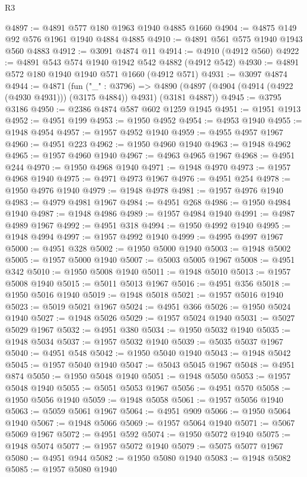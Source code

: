 \begin{lexlean}{R3}
\begin{coremodule}
@4897 := @4891 @577 @180 @1963 @1940 @4885 @1660
@4904 := @4875 @149 @92 @576 @1961 @1940 @4884 @4885
@4910 := @4891 @561 @575 @1940 @1943 @560 @4883
@4912 := @3091 @4874 @11
@4914 := @4910 (@4912 @560)
@4922 := @4891 @543 @574 @1940 @1942 @542 @4882 (@4912 @542)
@4930 := @4891 @572 @180 @1940 @1940 @571 @1660 (@4912 @571)
@4931 := @3097 @4874
@4944 := @4871
    (fun ("_" : @3796) =>
    @4890 (@4897 (@4904 (@4914 (@4922 (@4930 @4931))) (@3175 @4884)) @4931) (@3181 @4887))
@4945 := @3795 @3186
@4950 := @2386 @4874 @587 @602 @1259 @1945
@4951 := @1951 @1913
@4952 := @4951 @199
@4953 := @1950 @4952
@4954 := @4953 @1940
@4955 := @1948 @4954
@4957 := @1957 @4952 @1940
@4959 := @4955 @4957 @1967
@4960 := @4951 @223
@4962 := @1950 @4960 @1940
@4963 := @1948 @4962
@4965 := @1957 @4960 @1940
@4967 := @4963 @4965 @1967
@4968 := @4951 @244
@4970 := @1950 @4968 @1940
@4971 := @1948 @4970
@4973 := @1957 @4968 @1940
@4975 := @4971 @4973 @1967
@4976 := @4951 @254
@4978 := @1950 @4976 @1940
@4979 := @1948 @4978
@4981 := @1957 @4976 @1940
@4983 := @4979 @4981 @1967
@4984 := @4951 @268
@4986 := @1950 @4984 @1940
@4987 := @1948 @4986
@4989 := @1957 @4984 @1940
@4991 := @4987 @4989 @1967
@4992 := @4951 @318
@4994 := @1950 @4992 @1940
@4995 := @1948 @4994
@4997 := @1957 @4992 @1940
@4999 := @4995 @4997 @1967
@5000 := @4951 @328
@5002 := @1950 @5000 @1940
@5003 := @1948 @5002
@5005 := @1957 @5000 @1940
@5007 := @5003 @5005 @1967
@5008 := @4951 @342
@5010 := @1950 @5008 @1940
@5011 := @1948 @5010
@5013 := @1957 @5008 @1940
@5015 := @5011 @5013 @1967
@5016 := @4951 @356
@5018 := @1950 @5016 @1940
@5019 := @1948 @5018
@5021 := @1957 @5016 @1940
@5023 := @5019 @5021 @1967
@5024 := @4951 @366
@5026 := @1950 @5024 @1940
@5027 := @1948 @5026
@5029 := @1957 @5024 @1940
@5031 := @5027 @5029 @1967
@5032 := @4951 @380
@5034 := @1950 @5032 @1940
@5035 := @1948 @5034
@5037 := @1957 @5032 @1940
@5039 := @5035 @5037 @1967
@5040 := @4951 @548
@5042 := @1950 @5040 @1940
@5043 := @1948 @5042
@5045 := @1957 @5040 @1940
@5047 := @5043 @5045 @1967
@5048 := @4951 @874
@5050 := @1950 @5048 @1940
@5051 := @1948 @5050
@5053 := @1957 @5048 @1940
@5055 := @5051 @5053 @1967
@5056 := @4951 @570
@5058 := @1950 @5056 @1940
@5059 := @1948 @5058
@5061 := @1957 @5056 @1940
@5063 := @5059 @5061 @1967
@5064 := @4951 @909
@5066 := @1950 @5064 @1940
@5067 := @1948 @5066
@5069 := @1957 @5064 @1940
@5071 := @5067 @5069 @1967
@5072 := @4951 @592
@5074 := @1950 @5072 @1940
@5075 := @1948 @5074
@5077 := @1957 @5072 @1940
@5079 := @5075 @5077 @1967
@5080 := @4951 @944
@5082 := @1950 @5080 @1940
@5083 := @1948 @5082
@5085 := @1957 @5080 @1940

\end{coremodule}
\end{lexlean}
